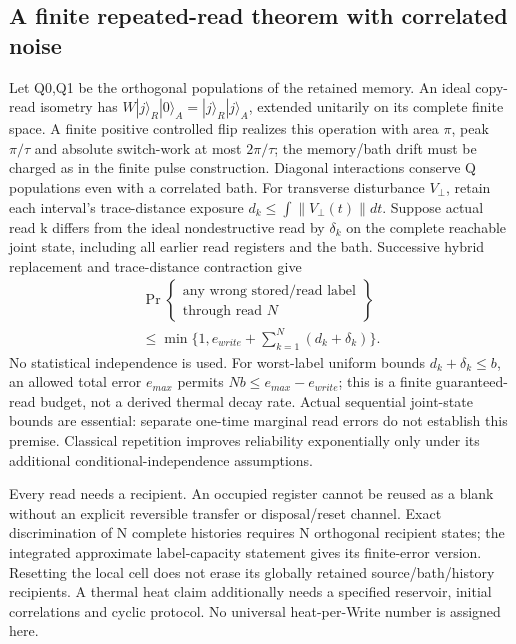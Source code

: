 \subsection{A finite repeated-read theorem with correlated noise}
Let Q0,Q1 be the orthogonal populations of the retained memory. An ideal
copy-read isometry has
\(W|j\rangle_R|0\rangle_A=|j\rangle_R|j\rangle_A\), extended
unitarily on its complete finite space. A finite positive controlled
flip realizes this operation with area \(\pi\), peak \(\pi/\tau\)
and absolute switch-work at most \(2\pi/\tau\); the memory/bath drift
must be charged as in the finite pulse construction.
Diagonal interactions conserve Q populations even with a correlated
bath. For transverse disturbance \(V_\perp\), retain each interval's
trace-distance exposure \(d_k\leq\int\|V_\perp(t)\|dt\).
Suppose actual read k differs from the ideal nondestructive read by
\(\delta_k\) on the complete reachable joint state, including all
earlier read registers and the bath. Successive hybrid replacement and
trace-distance contraction give
\[
 \begin{gathered}\Pr\left\{\begin{gathered}\text{any wrong stored/read label}\\\text{through read }N\end{gathered}\right\}\\
 \leq\min\{1,e_{write}+\sum_{k=1}^N(d_k+\delta_k)\}.\end{gathered}
\]
No statistical independence is used. For worst-label uniform bounds
\(d_k+\delta_k\leq b\), an allowed total error \(e_{max}\) permits
\(N b\leq e_{max}-e_{write}\); this is a finite guaranteed-read budget,
not a derived thermal decay rate. Actual sequential joint-state bounds
are essential: separate one-time marginal read errors do not establish
this premise. Classical repetition improves reliability exponentially
only under its additional conditional-independence assumptions.

Every read needs a recipient. An occupied register cannot be reused as
a blank without an explicit reversible transfer or disposal/reset channel.
Exact discrimination of N complete histories requires N orthogonal
recipient states; the integrated approximate label-capacity statement
gives its finite-error version. Resetting the local cell does not erase
its globally retained source/bath/history recipients. A thermal heat
claim additionally needs a specified reservoir, initial correlations and
cyclic protocol. No universal heat-per-Write number is assigned here.

